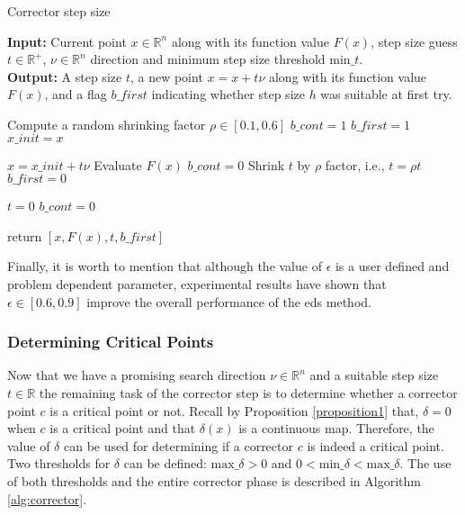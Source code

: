 \begin{algorithm}[H]
\caption{Corrector step size}\label{alg:corrector_stepsize}
\textbf{Input:} Current point $x \in \mathbb{R}^n$ along with its function value $F(x)$, step size guess $t \in \mathbb{R}^+$, $\nu \in \mathbb{R}^n$ direction and minimum step size threshold $\text{min\_}t$.\\
\textbf{Output:} A step size $t$, a new point $x = x + t \nu$ along with its function value $F(x)$, and a flag $b\_first$ indicating whether step size $h$ was suitable at first try.
	\begin{algorithmic}[1]
			
	    \State Compute a random shrinking factor $\rho \in [0.1,0.6]$
		\State $b\_cont = 1$
		\State $b\_first = 1$
		\State $x\_init = x$
		
  
  			\State $x = x\_init + t \nu$
  			\State Evaluate $F(x)$
  				\State $b\_cont = 0$
   			\Else
   				\State Shrink $t$ by $\rho$ factor, i.e., $t = \rho t$
   				\State $b\_first = 0$
			\EndIf
			
				\State $t = 0$
				\State $b\_cont = 0$
			\EndIf		
		
		\EndWhile	    
		
		\State return $[x, F(x), t, b\_first]$   
	\end{algorithmic}
\end{algorithm}

Finally, it is worth to mention that although the value of $\epsilon$ is a user defined and problem dependent parameter, experimental results have shown that $\epsilon \in [0.6, 0.9]$ improve the overall performance of the \gls{eds} method.

\subsubsection{Determining Critical Points}
\label{sec:determining_pareto_critical_points}

Now that we have a promising search direction $\nu \in \mathbb{R}^n$ and a suitable step size $t \in \mathbb{R}$ the remaining task of the corrector step is to determine whether a corrector point $c$ is a critical point or not. Recall by Proposition \ref{proposition1} that, $\delta = 0$ when $c$ is a critical point and that $\delta(x)$ is a continuous map. Therefore, the value of $\delta$ can be used for determining if a corrector $c$ is indeed a critical point. Two thresholds for $\delta$ can be defined: $\text{max\_}\delta > 0$ and $0 < \text{min\_}\delta < \text{max\_}\delta$. The use of both thresholds and the entire corrector phase is described in Algorithm \ref{alg:corrector}.

